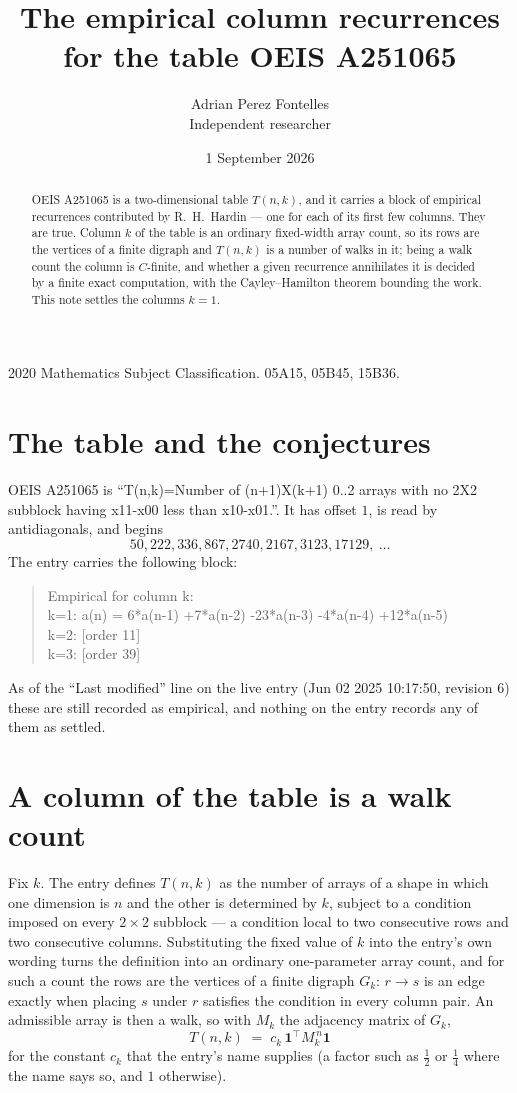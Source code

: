 \documentclass[11pt,a4paper]{article}
\title{The empirical column recurrences for the table OEIS A251065}
\author{Adrian Perez Fontelles\\ \small Independent researcher}
\date{1 September 2026}
\theoremstyle{plain}
\theoremstyle{definition}
\begin{document}
\maketitle

\begin{abstract}
OEIS A251065 is a two-dimensional table $T(n,k)$, and it carries a block of empirical
recurrences contributed by R.~H.~Hardin --- one for each of its first few columns. They are
true. Column $k$ of the table is an ordinary fixed-width array count, so its rows are the
vertices of a finite digraph and $T(n,k)$ is a number of walks in it; being a walk count the
column is $C$-finite, and whether a given recurrence annihilates it is decided by a finite
exact computation, with the Cayley--Hamilton theorem bounding the work. This note settles the
columns $k=1$.
\end{abstract}

\noindent\small 2020 Mathematics Subject Classification. 05A15, 05B45, 15B36.\normalsize

\section{The table and the conjectures}

OEIS A251065 is ``T(n,k)=Number of (n+1)X(k+1) 0..2 arrays with no 2X2 subblock having x11-x00 less than x10-x01.''. It has offset $1$, is
read by antidiagonals, and begins
\[
50, 222, 336, 867, 2740, 2167, 3123, 17129,\ \dots
\]
The entry carries the following block:
\begin{quote}\small
Empirical for column k:\\
k=1: a(n) = 6*a(n-1) +7*a(n-2) -23*a(n-3) -4*a(n-4) +12*a(n-5)\\
k=2: [order 11]\\
k=3: [order 39]\\
\end{quote}
As of the ``Last modified'' line on the live entry (Jun 02 2025 10:17:50, revision 6) these are still
recorded as empirical, and nothing on the entry records any of them as settled.

\section{A column of the table is a walk count}

Fix $k$. The entry defines $T(n,k)$ as the number of arrays of a shape in which one dimension
is $n$ and the other is determined by $k$, subject to a condition imposed on every
$2\times2$ subblock --- a condition local to two consecutive rows and two consecutive columns.
Substituting the fixed value of $k$ into the entry's own wording turns the definition into an
ordinary one-parameter array count, and for such a count the rows are the vertices of a finite
digraph $G_k$: $r\to s$ is an edge exactly when placing $s$ under $r$ satisfies the condition
in every column pair. An admissible array is then a walk, so with $M_k$ the adjacency matrix
of $G_k$,
\[
T(n,k)\;=\;c_k\,\mathbf{1}^{\!\top}M_k^{\,n}\mathbf{1}
\]
for the constant $c_k$ that the entry's name supplies (a factor such as $\tfrac12$ or
$\tfrac14$ where the name says so, and $1$ otherwise).
\end{document}
